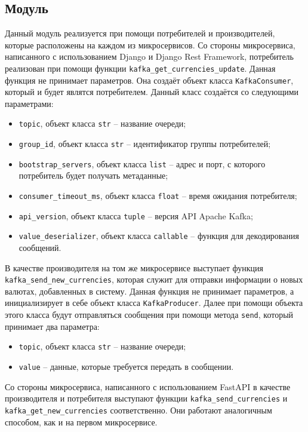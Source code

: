 \subsection{Модуль \moduleCommunication}\label{subsec:func:module-communication}
Данный модуль реализуется при помощи потребителей и производителей, которые расположены на каждом из микросервисов.
Со стороны микросервиса, написанного с использованием Django и Django Rest Framework, потребитель реализован при помощи
функции \lstinline{kafka_get_currencies_update}.
Данная функция не принимает параметров.
Она создаёт объект класса \lstinline{KafkaConsumer}, который и будет являтся потребителем.
Данный класс создаётся со следующими параметрами:
\begin{itemize}
    \item \lstinline{topic}, объект класса \lstinline{str} -- название очереди;
    \item \lstinline{group_id}, объект класса \lstinline{str} -- идентификатор группы потребителей;
    \item \lstinline{bootstrap_servers}, объект класса \lstinline{list} -- адрес и порт, с которого потребитель будет получать метаданные;
    \item \lstinline{consumer_timeout_ms}, объект класса \lstinline{float} -- время ожидания потребителя;
    \item \lstinline{api_version}, объект класса \lstinline{tuple} -- версия API Apache Kafka;
    \item \lstinline{value_deserializer}, объект класса \lstinline{callable} -- функция для декодирования сообщений.
\end{itemize}
В качестве производителя на том же микросервисе выступает функция \lstinline{kafka_send_new_currencies}, которая служит для отправки информации о новых валютах, добавленных в систему.
Данная функция не принимает параметров, а инициализирует в себе объект класса \lstinline{KafkaProducer}.
Далее при помощи объекта этого класса будут отправляться сообщения при помощи метода \lstinline{send},
который принимает два параметра:
\begin{itemize}
    \item \lstinline{topic}, объект класса \lstinline{str} -- название очереди;
    \item \lstinline{value} -- данные, которые требуется передать в сообщении.
\end{itemize}

Со стороны микросервиса, написанного с использованием FastAPI в качестве производителя и потребителя выступают функции
\lstinline{kafka_send_currencies} и \lstinline{kafka_get_new_currencies} соответственно.
Они работают аналогичным способом, как и на первом микросервисе.

